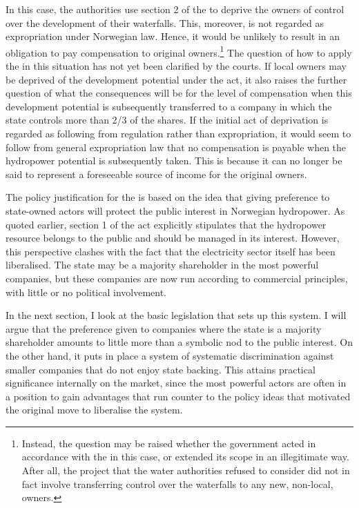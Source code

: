 In this case, the authorities use section 2 of the \cite{ica17} to deprive the owners of control over the development of their waterfalls. This, moreover, is not regarded as expropriation under Norwegian law. Hence, it would be unlikely to result in an obligation to pay compensation to original owners.\footnote{Instead, the question may be raised whether the government acted in accordance with the \cite{ica17} in this case, or extended its scope in an illegitimate way. After all, the project that the water authorities refused to consider did not in fact involve transferring control over the waterfalls to any new, non-local, owners.} The question of how to apply the \cite{ica17} in this situation has not yet been clarified by the courts. If local owners may be deprived of the development potential under the act, it also raises the further question of what the consequences will be for the level of compensation when this development potential is subsequently transferred to a company in which the state controls more than 2/3 of the shares. If the initial act of deprivation is regarded as following from regulation rather than expropriation, it would seem to follow from general expropriation law that no compensation is payable when the hydropower potential is subsequently taken. This is because it can no longer be said to represent a foreseeable source of income for the original owners.

The policy justification for the \cite{ica17} is based on the idea that giving preference to state-owned actors will protect the public interest in Norwegian hydropower. As quoted earlier, section 1 of the act explicitly stipulates that the hydropower resource belongs to the public and should be managed in its interest. However, this perspective clashes with the fact that the electricity sector itself has been liberalised. The state may be a majority shareholder in the most powerful companies, but these companies are now run according to commercial principles, with little or no political involvement.

In the next section, I look at the basic legislation that sets up this system. I will argue that the preference given to companies where the state is a majority shareholder amounts to little more than a symbolic nod to the public interest. On the other hand, it puts in place a system of systematic discrimination against smaller companies that do not enjoy state backing. This attains practical significance internally on the market, since the most powerful actors are often in a position to gain advantages that run counter to the policy ideas that motivated the original move to liberalise the system.

